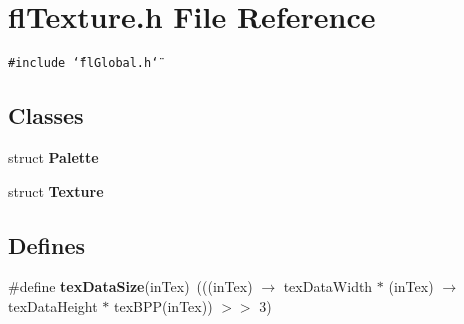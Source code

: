 \section{fl\-Texture.h File Reference}
\label{flTexture_8h}
{\tt \#include \char`\"{}fl\-Global.h\char`\"{}}\par
\subsection*{Classes}
\begin{CompactItemize}
\item 
struct {\bf Palette}
\item 
struct {\bf Texture}
\end{CompactItemize}
\subsection*{Defines}
\begin{CompactItemize}
\item 
\#define {\bf tex\-Data\-Size}(in\-Tex)~(((in\-Tex) $\rightarrow$ tex\-Data\-Width $\ast$ (in\-Tex) $\rightarrow$ tex\-Data\-Height $\ast$ tex\-BPP(in\-Tex)) $>$$>$ 3)
\end{CompactItemize}
